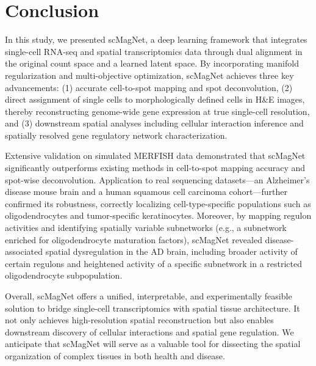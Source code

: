 \documentclass[10pt,a4paper]{article}
\begin{document}
\section{Conclusion}
In this study, we presented scMagNet, a deep learning framework that integrates single-cell RNA-seq and spatial transcriptomics data through dual alignment in the original count space and a learned latent space. By incorporating manifold regularization and multi-objective optimization, scMagNet achieves three key advancements: (1) accurate cell-to-spot mapping and spot deconvolution, (2) direct assignment of single cells to morphologically defined cells in H&E images, thereby reconstructing genome-wide gene expression at true single-cell resolution, and (3) downstream spatial analyses including cellular interaction inference and spatially resolved gene regulatory network characterization.

Extensive validation on simulated MERFISH data demonstrated that scMagNet significantly outperforms existing methods in cell-to-spot mapping accuracy and spot-wise deconvolution. Application to real sequencing datasets—an Alzheimer's disease mouse brain and a human squamous cell carcinoma cohort—further confirmed its robustness, correctly localizing cell-type-specific populations such as oligodendrocytes and tumor-specific keratinocytes. Moreover, by mapping regulon activities and identifying spatially variable subnetworks (e.g., a subnetwork enriched for oligodendrocyte maturation factors), scMagNet revealed disease-associated spatial dysregulation in the AD brain, including broader activity of certain regulons and heightened activity of a specific subnetwork in a restricted oligodendrocyte subpopulation.

Overall, scMagNet offers a unified, interpretable, and experimentally feasible solution to bridge single-cell transcriptomics with spatial tissue architecture. It not only achieves high-resolution spatial reconstruction but also enables downstream discovery of cellular interactions and spatial gene regulation. We anticipate that scMagNet will serve as a valuable tool for dissecting the spatial organization of complex tissues in both health and disease.
\end{document}
